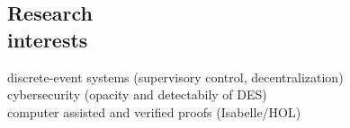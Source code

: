\documentclass[margin]{res}
\newcommand{\fullhrulefill}{%
  \hspace*{-\sectionwidth}\hrulefill%
  }
\def\theyear{#2#3#4#5}%
\def\themonth{#6#7}%
\def\theday{#8#9}%
\def\thehour{#1#2}%
\def\theminute{#3#4}%
\def\thesecond{#5#6}%
\def\thetimezonehour{+00}%
\def\thetimezoneminute{00}%
\def\thetimezonehour{#1}%
\def\thetimezoneminute{#2}%
\newcommand*{\thetimezone}{\thetimezonehour:\thetimezoneminute}
\begin{document}
\begin{resume}

\fullhrulefill







\section{Research\\interests}
discrete-event systems (supervisory control, decentralization) \\
cybersecurity (opacity and detectabily of DES) \\
computer assisted and verified proofs (Isabelle/HOL)


\end{resume}
\end{document}
